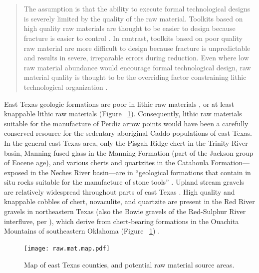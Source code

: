 \documentclass[review]{elsarticle}
\begin{document}
\linenumbers

\section*{}

\begin{quote}
The assumption is that the ability to execute formal technological designs is severely limited by the quality of the raw material. Toolkits based on high quality raw materials are thought to be easier to design because fracture is easier to control \citep{RN4315,RN8924}. In contrast, toolkits based on poor quality raw material are more difficult to design because fracture is unpredictable and results in severe, irreparable errors during reduction. Even where low raw material abundance would encourage formal technological design, raw material quality is thought to be the overriding factor constraining lithic technological organization \citep[257]{RN5907}.
\end{quote}

East Texas geologic formations are poor in lithic raw materials \citep[Figure 2.1]{RN439}, or at least knappable lithic raw materials (Figure ~\ref{fig:raw.map}). Consequently, lithic raw materials suitable for the manufacture of Perdiz arrow points would have been a carefully conserved resource for the sedentary aboriginal Caddo populations of east Texas. In the general east Texas area, only the Pisgah Ridge chert in the Trinity River basin, Manning fused glass in the Manning Formation (part of the Jackson group of Eocene age), and various cherts and quartzites in the Catahoula Formation---exposed in the Neches River basin---are in “geological formations that contain in situ rocks suitable for the manufacture of stone tools” \citep[49]{RN439}. Upland stream gravels are relatively widespread throughout parts of east Texas \citep[56-57]{RN439}. High quality and knappable cobbles of chert, novaculite, and quartzite are present in the Red River gravels in northeastern Texas (also the Bowie gravels of the Red-Sulphur River interfluve, per \citet{RN846}), which derive from chert-bearing formations in the Ouachita Mountains of southeastern Oklahoma (Figure ~\ref{fig:raw.map}) \citep[Figure 1.20]{RN439}.

\begin{figure}[!]\centering
\texttt{[image: raw.mat.map.pdf]}
\caption{Map of east Texas counties, and potential raw material source areas.}
\label{fig:raw.map}
\end{figure}
\end{document}
